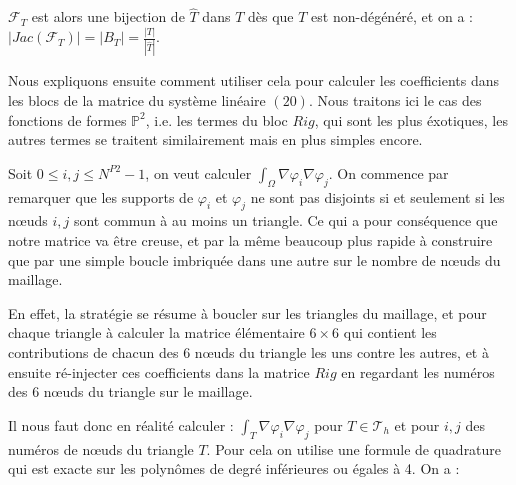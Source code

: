 \documentclass[a4paper,12pt]{article}
\begin{document}
$\mathcal{F}_T$ est alors une bijection de $\widehat{T}$ dans $T$ dès que $T$ est non-dégénéré, et on a : $|Jac \left( \mathcal{F}_T \right) | = | B_T | = \frac{|T|}{|\widehat{T}|}$.

Nous expliquons ensuite comment utiliser cela pour calculer les coefficients dans les blocs de la matrice du système linéaire $(20)$. Nous traitons ici le cas des fonctions de formes $\mathbb{P}^2$, i.e. les termes du bloc $Rig$, qui sont les plus éxotiques, les autres termes se traitent similairement mais en plus simples encore.

Soit $ 0 \leq i,j \leq N^{P2}-1 $, on veut calculer $\int_\Omega \nabla \varphi_i \nabla \varphi_j $. On commence par remarquer que les supports de $\varphi_i$ et $\varphi_j$ ne sont pas disjoints si et seulement si les nœuds $i,j$ sont commun à au moins un triangle. Ce qui a pour conséquence que notre matrice va être creuse, et par la même beaucoup plus rapide à construire que par une simple boucle imbriquée dans une autre sur le nombre de nœuds du maillage.

En effet, la stratégie se résume à boucler sur les triangles du maillage, et pour chaque triangle à calculer la matrice élémentaire $6\times6$ qui contient les contributions de chacun des $6$ nœuds du triangle les uns contre les autres, et à ensuite ré-injecter ces coefficients dans la matrice $Rig$ en regardant les numéros des 6 nœuds du triangle sur le maillage.

Il nous faut donc en réalité calculer : $\int_T \nabla \varphi_i \nabla \varphi_j$ pour $T \in \mathcal{T}_h$ et pour $i,j$ des numéros de nœuds du triangle $T$. Pour cela on utilise une formule de quadrature qui est exacte sur les polynômes de degré inférieures ou égales à 4.
On a :
\end{document}
